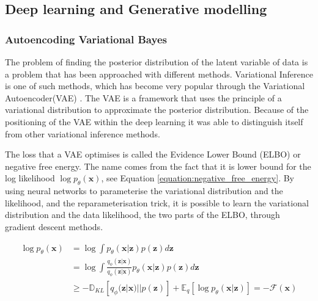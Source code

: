 \documentclass{article}
\newcommand{\bx}{\mathbf{x}}
\newcommand{\bz}{\mathbf{z}}
\begin{document}




\subsection{Deep learning and Generative modelling}

\subsubsection*{Autoencoding Variational Bayes}
The problem of finding the posterior distribution of the latent variable of data is a problem that has been approached with different methods. Variational Inference is one of such methods, which has become very popular through the Variational Autoencoder(VAE) \cite{kingma2013auto}. The VAE is a framework that uses the principle of a variational distribution to approximate the posterior distribution. Because of the positioning of the VAE within the deep learning it was able to distinguish itself from other variational inference methods. 

The loss that a VAE optimises is called the Evidence Lower Bound (ELBO) or negative free energy. The name comes from the  fact that it is lower bound for the log likelihood $\log p_\theta(\bx)$, see Equation \ref{equation:negative_free_energy}. By using neural networks to parameterise the variational distribution and the likelihood, and the reparameterisation trick, it is possible to learn the variational distribution and the data likelihood, the two parts of the ELBO, through gradient descent methods.

\begin{equation}\label{equation:negative_free_energy}
    \begin{split}
    \log p_\theta(\bx) &= \log \int p_\theta(\bx | \bz) p(\bz) d\bz\\
    &= \log \int \frac{q_\phi(\bz|\bx)}{q_\phi(\bz|\bx)} p_\theta(\bx | \bz) p(\bz) d\bz\\
    &\geq -\mathbb{D}_{KL}[q_\phi(\bz|\bx) || p(\bz)] + \mathbb{E}_q[\log p_\theta(\bx|\bz)] = -\mathcal{F}(\bx)
    \end{split}    
\end{equation}
    
\end{document}
